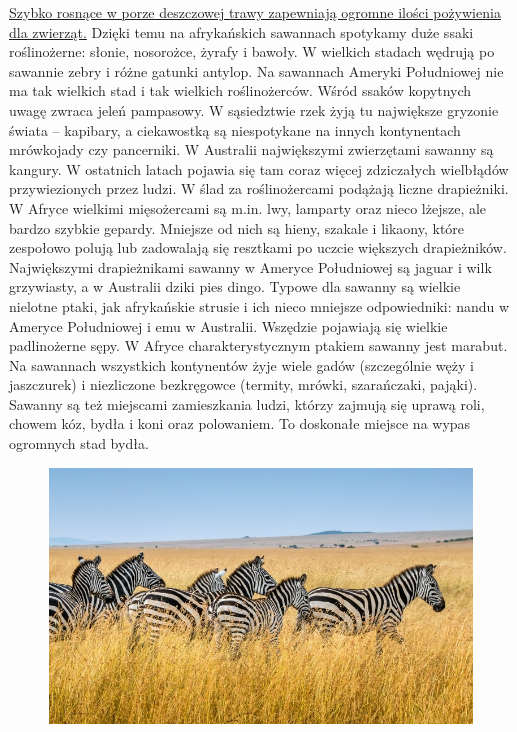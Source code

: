 \documentclass[14pt]{beamer}
\begin{document}
\begin{frame}{\color{black}{Zwierzęta}}
    \tiny   \underline{Szybko rosnące w porze deszczowej trawy zapewniają ogromne ilości pożywienia dla zwierząt.} Dzięki temu na afrykańskich sawannach spotykamy duże ssaki roślinożerne: słonie, nosorożce, żyrafy i bawoły. W wielkich stadach wędrują po sawannie zebry i różne gatunki antylop. Na sawannach Ameryki Południowej nie ma tak wielkich stad i tak wielkich roślinożerców. Wśród ssaków kopytnych uwagę zwraca jeleń pampasowy. W sąsiedztwie rzek żyją tu największe gryzonie świata – kapibary, a ciekawostką są niespotykane na innych kontynentach mrówkojady czy pancerniki. W Australii największymi zwierzętami sawanny są kangury. W ostatnich latach pojawia się tam coraz więcej zdziczałych wielbłądów przywiezionych przez ludzi.
    \tiny   W ślad za roślinożercami podążają liczne drapieżniki. W Afryce wielkimi mięsożercami są m.in. lwy, lamparty oraz nieco lżejsze, ale bardzo szybkie gepardy. Mniejsze od nich są hieny, szakale i likaony, które zespołowo polują lub zadowalają się resztkami po uczcie większych drapieżników. Największymi drapieżnikami sawanny w Ameryce Południowej są jaguar i wilk grzywiasty, a w Australii dziki pies dingo.
    \tiny   Typowe dla sawanny są wielkie nielotne ptaki, jak afrykańskie strusie i ich nieco mniejsze odpowiedniki: nandu w Ameryce Południowej i emu w Australii. Wszędzie pojawiają się wielkie padlinożerne sępy. W Afryce charakterystycznym ptakiem sawanny jest marabut. Na sawannach wszystkich kontynentów żyje wiele gadów (szczególnie węży i jaszczurek) i niezliczone bezkręgowce (termity, mrówki, szarańczaki, pająki).
    \tiny   Sawanny są też miejscami zamieszkania ludzi, którzy zajmują się uprawą roli, chowem kóz, bydła i koni oraz polowaniem. To doskonałe miejsce na wypas ogromnych stad bydła.
\end{frame}

\begin{frame}{\color{black}{Zdjecie zebr na sawannie}}    
    \begin{figure}
        \centering
        \includegraphics[scale = 0.4082]{Sawanna2.jpg}
        \label{fig:my_label}
    \end{figure}
\end{frame}
\end{document}
